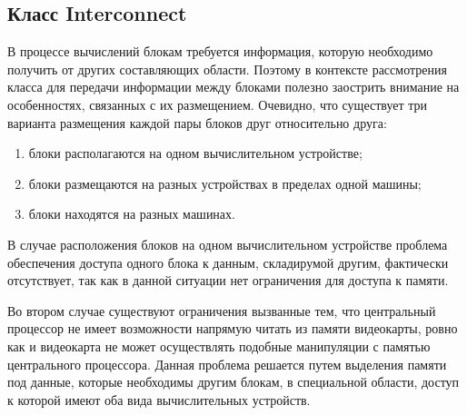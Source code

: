 \documentclass[a4paper, 14pt]{article}
\theoremstyle{definition}
\begin{document}
\newpage
\subsection{Класс Interconnect}

\par В процессе вычислений блокам требуется информация, которую необходимо получить от других составляющих области. Поэтому в контексте рассмотрения класса для передачи информации между блоками полезно заострить внимание на особенностях, связанных с их размещением. Очевидно, что существует три варианта размещения каждой пары блоков друг относительно друга:
\begin{enumerate}
\item блоки располагаются на одном вычислительном устройстве;
\item блоки размещаются на разных устройствах в пределах одной машины;
\item блоки находятся на разных машинах.
\end{enumerate}

\par В случае расположения блоков на одном вычислительном устройстве проблема обеспечения доступа одного блока к данным, складирумой другим, фактически отсутствует, так как в данной ситуации нет ограничения для доступа к памяти.

\par Во втором случае существуют ограничения вызванные тем, что центральный процессор не имеет возможности напрямую читать из памяти видеокарты, ровно как и видеокарта не может осуществлять подобные манипуляции с памятью центрального процессора. Данная проблема решается путем выделения памяти под данные, которые необходимы другим блокам, в специальной области, доступ к которой имеют оба вида вычислительных устройств.
\end{document}
